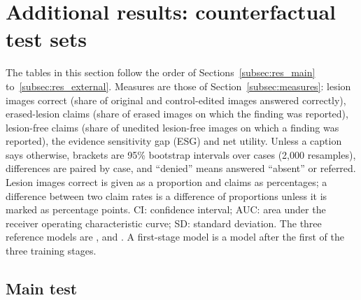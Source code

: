 
\section{Additional results: counterfactual test sets}\label{sec:s_results_a}

The tables in this section follow the order of Sections~\ref{subsec:res_main} to~\ref{subsec:res_external}.
Measures are those of Section~\ref{subsec:measures}: lesion images correct (share of original and control-edited images answered correctly), erased-lesion claims (share of erased images on which the finding was reported), lesion-free claims (share of unedited lesion-free images on which a finding was reported), the evidence sensitivity gap (ESG) and net utility.
Unless a caption says otherwise, brackets are 95\% bootstrap intervals over cases (2{,}000 resamples), differences are paired by case, and ``denied'' means answered ``absent'' or referred.
Lesion images correct is given as a proportion and claims as percentages; a difference between two claim rates is a difference of proportions unless it is marked as percentage points.
CI: confidence interval; AUC: area under the receiver operating characteristic curve; SD: standard deviation.
The three reference models are \gem, \opus{} and \gpt.
A first-stage model is a model after the first of the three training stages.
\providecommand{\Chd}[2]{\parbox[b]{#1}{\centering\strut #2\strut}}

\subsection{Main test}

